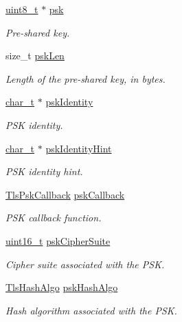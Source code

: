 \begin{DoxyCompactItemize}
\hyperlink{stdint_8h_aba7bc1797add20fe3efdf37ced1182c5}{uint8\+\_\+t} $\ast$ \hyperlink{struct__TlsContext_abe7249236cfe6139a35f9104e64615a2}{psk}
\begin{DoxyCompactList}\small\item\em Pre-\/shared key. \end{DoxyCompactList}\item 
size\+\_\+t \hyperlink{struct__TlsContext_a4c6dc0ac8ff861b8291e15fc85825039}{psk\+Len}
\begin{DoxyCompactList}\small\item\em Length of the pre-\/shared key, in bytes. \end{DoxyCompactList}\item 
\hyperlink{compiler__port_8h_a40bb5262bf908c328fbcfbe5d29d0201}{char\+\_\+t} $\ast$ \hyperlink{struct__TlsContext_acdbfdaed1815034460049b314d6c7c71}{psk\+Identity}
\begin{DoxyCompactList}\small\item\em P\+SK identity. \end{DoxyCompactList}\item 
\hyperlink{compiler__port_8h_a40bb5262bf908c328fbcfbe5d29d0201}{char\+\_\+t} $\ast$ \hyperlink{struct__TlsContext_ab17b03e7b8f8a69d5ef1f8b225460fdb}{psk\+Identity\+Hint}
\begin{DoxyCompactList}\small\item\em P\+SK identity hint. \end{DoxyCompactList}\item 
\hyperlink{tls_8h_a389807e343d8c65f8080ec9bd71fa91d}{Tls\+Psk\+Callback} \hyperlink{struct__TlsContext_aa6dc157adb25fcf8f14110f768936bd1}{psk\+Callback}
\begin{DoxyCompactList}\small\item\em P\+SK callback function. \end{DoxyCompactList}\item 
\hyperlink{stdint_8h_a273cf69d639a59973b6019625df33e30}{uint16\+\_\+t} \hyperlink{struct__TlsContext_a1dd31b315bbc5f418f30a66f9a5d1a77}{psk\+Cipher\+Suite}
\begin{DoxyCompactList}\small\item\em Cipher suite associated with the P\+SK. \end{DoxyCompactList}\item 
\hyperlink{tls_8h_a98b0299cd7e197edc67123642089156d}{Tls\+Hash\+Algo} \hyperlink{struct__TlsContext_a2a3c7d46bdf2b5f40fc0267263cbe95a}{psk\+Hash\+Algo}
\begin{DoxyCompactList}\small\item\em Hash algorithm associated with the P\+SK. \end{DoxyCompactList}\item 

\end{DoxyCompactItemize}
